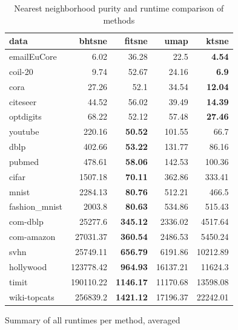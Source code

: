 \begin{table}[tb]
\begin{subtable}{\linewidth}
\end{subtable}
\par\bigskip
\begin{subtable}{\linewidth}
    \centering
  \begin{tabular}{lrrrr}
\toprule
data & bhtsne & fitsne & umap & ktsne \\ \midrule
emailEuCore & \num{6.02} & \num{36.28} & \num{22.5} & \bfseries \num{4.54} \\
coil-20 & \num{9.74} & \num{52.67} & \num{24.16} & \bfseries \num{6.9} \\
cora & \num{27.26} & \num{52.1} & \num{34.54} & \bfseries \num{12.04} \\
citeseer & \num{44.52} & \num{56.02} & \num{39.49} & \bfseries \num{14.39} \\
optdigits & \num{68.22} & \num{52.12} & \num{57.48} & \bfseries \num{27.46} \\
youtube & \num{220.16} & \bfseries \num{50.52} & \num{101.55} & \num{66.7} \\
dblp & \num{402.66} & \bfseries \num{53.22} & \num{131.77} & \num{86.16} \\
pubmed & \num{478.61} & \bfseries \num{58.06} & \num{142.53} & \num{100.36} \\
cifar & \num{1507.18} & \bfseries \num{70.11} & \num{362.86} & \num{333.41} \\
mnist & \num{2284.13} & \bfseries \num{80.76} & \num{512.21} & \num{466.5} \\
fashion\_mnist & \num{2003.8} & \bfseries \num{80.63} & \num{534.86} & \num{515.43} \\
com-dblp & \num{25277.6} & \bfseries \num{345.12} & \num{2336.02} & \num{4517.64} \\
com-amazon & \num{27031.37} & \bfseries \num{360.54} & \num{2486.53} & \num{5450.24} \\
svhn & \num{25749.11} & \bfseries \num{656.79} & \num{6191.86} & \num{10212.89} \\
hollywood & \num{123778.42} & \bfseries \num{964.93} & \num{16137.21} & \num{11624.3} \\
timit & \num{190110.22} & \bfseries \num{1146.17} & \num{11170.68} & \num{13598.08} \\
wiki-topcats & \num{256839.2} & \bfseries \num{1421.12} & \num{17196.37} & \num{22242.01} \\
\bottomrule
  \end{tabular}
  \caption{Summary of all runtimes per method, averaged}
\end{subtable}
\caption{Nearest neighborhood purity and runtime comparison of methods}
\label{tab:comp}
\end{table}


